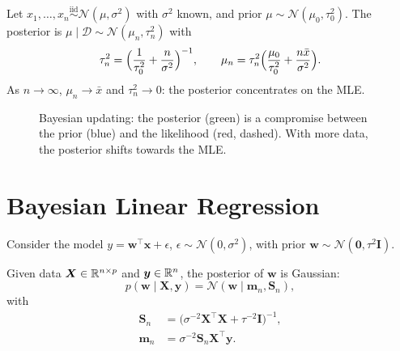 \begin{example}
Let $x_1,\dots,x_n\overset{\text{iid}}{\sim}\mathcal{N}(\mu,\sigma^2)$ with $\sigma^2$ known, and prior $\mu\sim\mathcal{N}(\mu_0,\tau_0^2)$. The posterior is $\mu\mid\mathcal{D}\sim\mathcal{N}(\mu_n,\tau_n^2)$ with
\[
  \tau_n^2 = \Bigl(\frac{1}{\tau_0^2}+\frac{n}{\sigma^2}\Bigr)^{-1}, \qquad
  \mu_n = \tau_n^2\Bigl(\frac{\mu_0}{\tau_0^2}+\frac{n\bar x}{\sigma^2}\Bigr).
\]
As $n\to\infty$, $\mu_n\to\bar x$ and $\tau_n^2\to 0$: the posterior concentrates on the MLE.
\end{example}

\begin{figure}[ht]
\centering
{}
\caption{Bayesian updating: the posterior (green) is a compromise between the prior (blue) and the likelihood (red, dashed). With more data, the posterior shifts towards the MLE.}
\label{fig:prior-posterior}
\end{figure}

\section{Bayesian Linear Regression}

Consider the model $y = \bm{w}^\top\bm{x}+\epsilon$, $\epsilon\sim\mathcal{N}(0,\sigma^2)$, with prior $\bm{w}\sim\mathcal{N}(\bm{0},\tau^2\bm{I})$.

\begin{theorem}
Given data $\bm{X}\in\mathbb{R}^{n\times p}$ and $\bm{y}\in\mathbb{R}^n$, the posterior of $\bm{w}$ is Gaussian:
\[
  p(\bm{w}\mid\bm{X},\bm{y}) = \mathcal{N}(\bm{w}\mid\bm{m}_n,\bm{S}_n),
\]
with
\begin{align}
  \bm{S}_n &= \bigl(\sigma^{-2}\bm{X}^\top\bm{X} + \tau^{-2}\bm{I}\bigr)^{-1}, \\
  \bm{m}_n &= \sigma^{-2}\bm{S}_n\bm{X}^\top\bm{y}.
\end{align}
\end{theorem}

